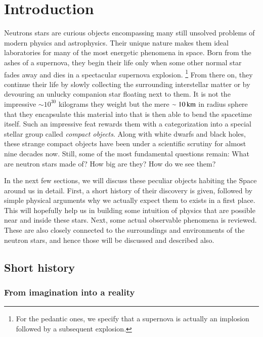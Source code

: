 \chapter{Introduction} 
Neutrons stars are curious objects encompassing many still unsolved problems of modern physics and astrophysics.
Their unique nature makes them ideal laboratories for many of the most energetic phenomena in space.
Born from the ashes of a supernova, they begin their life only when some other normal star fades away and dies in a spectacular supernova explosion.%
\footnote{ For the pedantic ones, we specify that a supernova is actually an implosion followed by a subsequent explosion.}
From there on, they continue their life by slowly collecting the surrounding interstellar matter or by devouring an unlucky companion star floating next to them.
It is not the impressive $\sim 10^{30}$ kilograms they weight but the mere $\sim 10 \, \mathrm{km}$ in radius sphere that they encapsulate this material into that is then able to bend the spacetime itself.
Such an impressive feat rewards them with a categorization into a special stellar group called \textit{compact objects}.
Along with white dwarfs and black holes, these strange compact objects have been under a scientific scrutiny for almost nine decades now.
Still, some of the most fundamental questions remain:
What are neutron stars made of?
How big are they?
How do we see them?

In the next few sections, we will discuss these peculiar objects habiting the Space around us in detail.
First, a short history of their discovery is given, followed by simple physical arguments why we actually expect them to exists in a first place.
This will hopefully help us in building some intuition of physics that are possible near and inside these stars.
Next, some actual observable phenomena is reviewed.
These are also closely connected to the surroundings and environments of the neutron stars, and hence those will be discussed and described also.


\section{Short history}
\subsection{From imagination into a reality}


